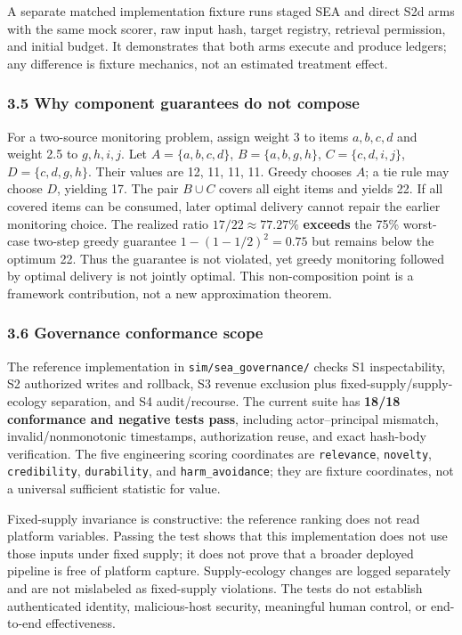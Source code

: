 \documentclass[
  11pt]{article}
\begin{document}
A separate matched implementation fixture runs staged SEA and direct S2d
arms with the same mock scorer, raw input hash, target registry,
retrieval permission, and initial budget. It demonstrates that both arms
execute and produce ledgers; any difference is fixture mechanics, not an
estimated treatment effect.

\subsubsection{3.5 Why component guarantees do not
compose}\label{why-component-guarantees-do-not-compose}

For a two-source monitoring problem, assign weight 3 to items
\(a,b,c,d\) and weight 2.5 to \(g,h,i,j\). Let \(A=\{a,b,c,d\}\),
\(B=\{a,b,g,h\}\), \(C=\{c,d,i,j\}\), \(D=\{c,d,g,h\}\). Their values
are 12, 11, 11, 11. Greedy chooses \(A\); a tie rule may choose \(D\),
yielding 17. The pair \(B\cup C\) covers all eight items and yields 22.
If all covered items can be consumed, later optimal delivery cannot
repair the earlier monitoring choice. The realized ratio
\(17/22\approx77.27\%\) \textbf{exceeds} the 75\% worst-case two-step
greedy guarantee \(1-(1-1/2)^2=0.75\) but remains below the optimum 22.
Thus the guarantee is not violated, yet greedy monitoring followed by
optimal delivery is not jointly optimal. This non-composition point is a
framework contribution, not a new approximation theorem.

\subsubsection{3.6 Governance conformance
scope}\label{governance-conformance-scope}

The reference implementation in \texttt{sim/sea\_governance/} checks S1
inspectability, S2 authorized writes and rollback, S3 revenue exclusion
plus fixed-supply/supply-ecology separation, and S4 audit/recourse. The
current suite has \textbf{18/18 conformance and negative tests pass},
including actor--principal mismatch, invalid/nonmonotonic timestamps,
authorization reuse, and exact hash-body verification. The five
engineering scoring coordinates are \texttt{relevance},
\texttt{novelty}, \texttt{credibility}, \texttt{durability}, and
\texttt{harm\_avoidance}; they are fixture coordinates, not a universal
sufficient statistic for value.

Fixed-supply invariance is constructive: the reference ranking does not
read platform variables. Passing the test shows that this implementation
does not use those inputs under fixed supply; it does not prove that a
broader deployed pipeline is free of platform capture. Supply-ecology
changes are logged separately and are not mislabeled as fixed-supply
violations. The tests do not establish authenticated identity,
malicious-host security, meaningful human control, or end-to-end
effectiveness.
\end{document}
